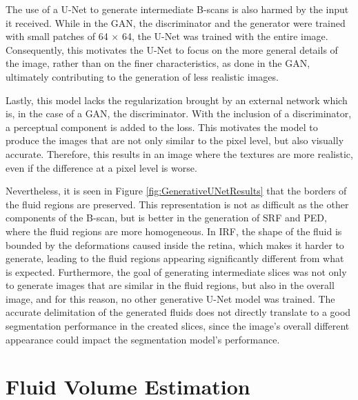 \par
The use of a U-Net to generate intermediate B-scans is also harmed by the input it received. While in the GAN, the discriminator and the generator were trained with small patches of 64 $\times$ 64, the U-Net was trained with the entire image. Consequently, this motivates the U-Net to focus on the more general details of the image, rather than on the finer characteristics, as done in the GAN, ultimately contributing to the generation of less realistic images.
\par
Lastly, this model lacks the regularization brought by an external network which is, in the case of a GAN, the discriminator. With the inclusion of a discriminator, a perceptual component is added to the loss. This motivates the model to produce the images that are not only similar to the pixel level, but also visually accurate. Therefore, this results in an image where the textures are more realistic, even if the difference at a pixel level is worse.
\par
Nevertheless, it is seen in Figure \ref{fig:GenerativeUNetResults} that the borders of the fluid regions are preserved. This representation is not as difficult as the other components of the B-scan, but is better in the generation of SRF and PED, where the fluid regions are more homogeneous. In IRF, the shape of the fluid is bounded by the deformations caused inside the retina, which makes it harder to generate, leading to the fluid regions appearing significantly different from what is expected. Furthermore, the goal of generating intermediate slices was not only to generate images that are similar in the fluid regions, but also in the overall image, and for this reason, no other generative U-Net model was trained. The accurate delimitation of the generated fluids does not directly translate to a good segmentation performance in the created slices, since the image's overall different appearance could impact the segmentation model's performance.

\section{Fluid Volume Estimation}\label{FluidVolumeEstimation}

